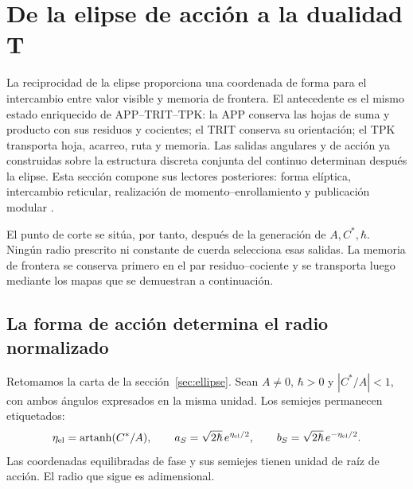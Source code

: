 
\section{De la elipse de acción a la dualidad T}
\label{sec:ii-dualidad-t}

La reciprocidad de la elipse proporciona una coordenada de forma para el
intercambio entre valor visible y memoria de frontera. El antecedente es el
mismo estado enriquecido de APP--TRIT--TPK: la APP conserva las hojas de
suma y producto con sus residuos y cocientes; el TRIT conserva su orientación;
el TPK transporta hoja, acarreo, ruta y memoria. Las salidas angulares y de
acción ya construidas sobre la estructura discreta conjunta del continuo
determinan después la elipse. Esta sección compone sus lectores posteriores:
forma elíptica, intercambio reticular, realización de momento--enrollamiento
y publicación modular \cite{elipse,hmtedicionintegral}.

El punto de corte se sitúa, por tanto, después de la generación de
\(A,C^*,\hbar\). Ningún radio prescrito ni constante de cuerda selecciona
esas salidas. La memoria de frontera se conserva primero en el par
residuo--cociente y se transporta luego mediante los mapas que se demuestran
a continuación.

\subsection{La forma de acción determina el radio normalizado}

Retomamos la carta de la sección~\ref{sec:ellipse}. Sean \(A\ne0\),
\(\hbar>0\) y \(|C^*/A|<1\), con ambos ángulos expresados en la misma
unidad. Los semiejes permanecen etiquetados:
\begin{equation}
 \eta_{\rm el}=\operatorname{artanh}(C^*/A),\qquad
 a_S=\sqrt{2\hbar}\,e^{\eta_{\rm el}/2},\qquad
 b_S=\sqrt{2\hbar}\,e^{-\eta_{\rm el}/2}.
 \label{eq:ii-t-elipse}
\end{equation}
Las coordenadas equilibradas de fase y sus semiejes tienen unidad de raíz
de acción. El radio que sigue es adimensional.

